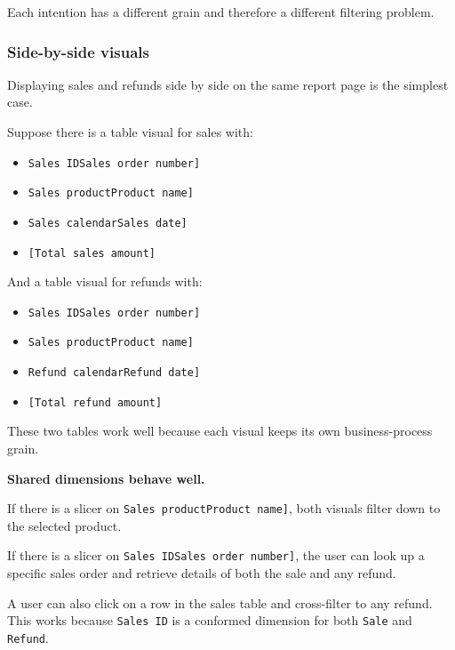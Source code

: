 \documentclass[10pt,openany,10pt]{book}
\providecommand{\tightlist}{%
  \setlength{\itemsep}{0pt}\setlength{\parskip}{0pt}}
\begin{document}
Each intention has a different grain and therefore a different filtering
problem.

\subsubsection{Side-by-side visuals}\label{side-by-side-visuals}

Displaying sales and refunds side by side on the same report page is the
simplest case.

Suppose there is a table visual for sales with:

\begin{itemize}
\tightlist
\item
  \texttt{\textquotesingle{}Sales\ ID\textquotesingle{}{[}Sales\ order\ number{]}}
\item
  \texttt{\textquotesingle{}Sales\ product\textquotesingle{}{[}Product\ name{]}}
\item
  \texttt{\textquotesingle{}Sales\ calendar\textquotesingle{}{[}Sales\ date{]}}
\item
  \texttt{{[}Total\ sales\ amount{]}}
\end{itemize}

And a table visual for refunds with:

\begin{itemize}
\tightlist
\item
  \texttt{\textquotesingle{}Sales\ ID\textquotesingle{}{[}Sales\ order\ number{]}}
\item
  \texttt{\textquotesingle{}Sales\ product\textquotesingle{}{[}Product\ name{]}}
\item
  \texttt{\textquotesingle{}Refund\ calendar\textquotesingle{}{[}Refund\ date{]}}
\item
  \texttt{{[}Total\ refund\ amount{]}}
\end{itemize}

These two tables work well because each visual keeps its own
business-process grain.

\textbf{Shared dimensions behave well.}

If there is a slicer on
\texttt{\textquotesingle{}Sales\ product\textquotesingle{}{[}Product\ name{]}},
both visuals filter down to the selected product.

If there is a slicer on
\texttt{\textquotesingle{}Sales\ ID\textquotesingle{}{[}Sales\ order\ number{]}},
the user can look up a specific sales order and retrieve details of both
the sale and any refund.

A user can also click on a row in the sales table and cross-filter to
any refund. This works because
\texttt{\textquotesingle{}Sales\ ID\textquotesingle{}} is a conformed
dimension for both \texttt{\textquotesingle{}Sale\textquotesingle{}} and
\texttt{\textquotesingle{}Refund\textquotesingle{}}.
\end{document}
